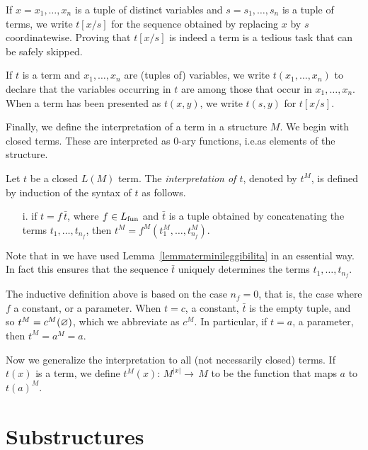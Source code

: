 If $x=x_1,\dots,x_n$ is a tuple of distinct variables and $s=s_1,\dots,s_n$ is a tuple of terms, we write \emph{$t[x/s]$\/} for the sequence obtained by replacing $x$ by $s$ coordinatewise. Proving that $t[x/s]$ is indeed a term is a tedious task that can be safely skipped.

If $t$ is a term and $x_1,\dots,x_n$ are (tuples of) variables, we write \emph{$t(x_1,\dots,x_n)$\/} to declare that the variables occurring in $t$ are among those that occur in $x_1,\dots,x_n$. When a term has been presented as $t(x,y)$, we write \emph{$t(s,y)$\/} for $t[x/s]$.

Finally, we define the interpretation of a term in a structure $M$. We begin with closed terms. These are interpreted as $0$-ary functions, i.e.\@ as elements of the structure.

\begin{definition}\label{defterminiinterpretazione}
Let $t$ be a closed $L(M)$ term. The \emph{interpretation of $t$}, denoted by \emph{$t^M$}, is defined by induction of the syntax of $t$ as follows.

\begin{itemize}
\item[i.] if $t=f\,\bar t$, where $f\in L_{\rm fun}$ and $\bar t$ is a tuple obtained by concatenating the terms $t_1,\dots,t_{n_f}$, then $t^M=f^M(t^M_1, \dots, t^M_{n_f})$.
\end{itemize}
Note that in  we have used Lemma~\ref{lemmaterminileggibilita} in an essential way. In fact this ensures that the sequence $\bar t$ uniquely determines the terms $t_1, \dots, t_{n_f}$.\QED
\end{definition}

The inductive definition above is based on the case $n_f=0$, that is, the case where $f$ a constant, or a parameter.  When $t=c$, a constant, $\bar t$ is the empty tuple, and so $t^M=c^M(\varnothing)$, which we abbreviate as $c^M$. In particular, if $t=a$, a parameter, then $t^M=a^M=a$.

Now we generalize the interpretation to all (not necessarily closed) terms. If $t(x)$ is a term, we define \emph{$t^M\!(x) :\,M^{|x|}\to\, M$} to be the function that maps $a$ to $t(a)^M$.

\section{Substructures}
\label{sottostrutture}



